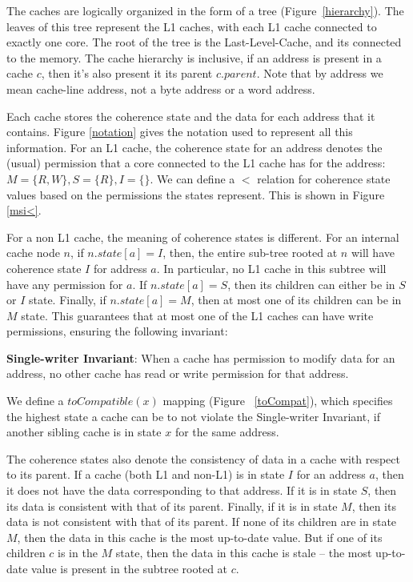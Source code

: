 The caches are logically organized in the form of a tree
(Figure~\ref{hierarchy}). The leaves of this tree represent the L1 caches,
with each L1 cache connected to exactly one core. The root of the tree is the
Last-Level-Cache, and its connected to the memory. The cache hierarchy is
inclusive, \ie if an address is present in a cache $c$, then it's also present it its
parent $c.parent$. Note that by address we mean cache-line address, not a byte
address or a word address.

Each cache stores the coherence state and the data for each address that it
contains.
Figure \ref{notation} gives the notation used to represent all this
information. For an L1 cache, the coherence state for an address denotes the
(usual) permission that a core connected to the L1 cache has for the address: $M
= \{R, W\}, S = \{R\}, I = \{\}$. We can define a $<$ relation for coherence
state values based on the permissions the states represent. This is shown in
Figure \ref{msi<}.

For a non L1 cache, the meaning of coherence states is different. For an
internal cache node $n$, if $n.state[a] = I$, then, the entire sub-tree rooted at $n$
will have coherence state $I$ for address $a$. In particular, no L1 cache in
this subtree will have any permission for $a$. If $n.state[a] = S$, then its
children can either be in $S$ or $I$ state. Finally, if $n.state[a] = M$, then
at most one of its children can be in $M$ state. This guarantees that at most
one of the L1 caches can have write permissions, ensuring the following
invariant:

\begin{theorem}
\textbf{Single-writer Invariant}: When a cache has permission to modify data for
an address, no other cache has read or write permission for that
address.
\label{singleWriter}
\end{theorem}

We define a $toCompatible(x)$ mapping (Figure ~\ref{toCompat}), which specifies
the highest state a cache can be to not violate the Single-writer Invariant, if
another sibling cache is in state $x$ for the same address.

The coherence states also denote the consistency of data in a cache with respect
to its parent. If a cache (both L1 and non-L1) is in state $I$ for an address $a$,
then it does not have the data corresponding to that address. If it is in state
$S$, then its data is consistent with that of its parent. Finally, if it is in
state $M$, then its data is not consistent with that of its parent. If none of
its children are in state $M$, then the data in this cache is the most
up-to-date value. But if one of its children $c$ is in the $M$ state, then the
data in this cache is stale -- the most up-to-date value is present in the
subtree rooted at $c$.

